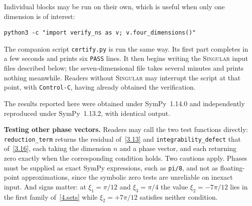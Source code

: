 \documentclass[11pt]{jfm}
\numberwithin{equation}{section}
\begin{document}
\noindent Individual blocks may be run on their own, which is useful when only one dimension is of
interest:
\begingroup\small
\begin{verbatim}
python3 -c "import verify_ns as v; v.four_dimensions()"
\end{verbatim}
\endgroup

\noindent The companion script \texttt{certify.py} is run the same way. Its first part completes in
a few seconds and prints six \texttt{PASS} lines. It then begins writing the \textsc{Singular}
input files described below; the seven-dimensional file takes several minutes and prints nothing
meanwhile. Readers without \textsc{Singular} may interrupt the script at that point, with
\texttt{Control-C}, having already obtained the verification.

The results reported here were obtained under SymPy~1.14.0 and independently reproduced under
SymPy~1.13.2, with identical output.

\medskip
\noindent\textbf{Testing other phase vectors.} Readers may call the two test functions directly:
\texttt{reduction\_term} returns the residual of~\eqref{3.13} and
\texttt{integrability\_defect} that of~\eqref{3.16}, each taking the dimension $n$ and a phase
vector, and each returning zero exactly when the corresponding condition holds. Two cautions apply. Phases must be supplied as exact SymPy
expressions, such as \texttt{pi/8}, and not as floating-point approximations, since the symbolic
zero tests are unreliable on inexact input. And signs matter: at $\xi_1=\pi/12$ and
$\xi_3=\pi/4$ the value $\xi_2=-7\pi/12$ lies in the first family of~\eqref{4.sets} while
$\xi_2=+7\pi/12$ satisfies neither condition.
\end{document}
